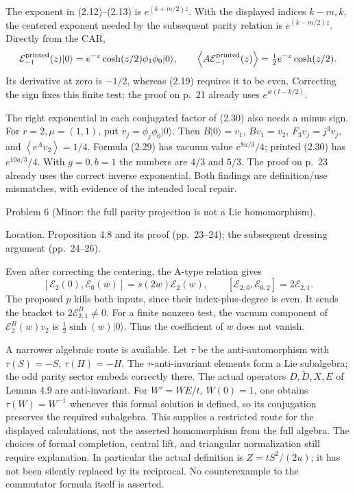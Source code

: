 \documentclass[10pt]{article}
\begin{document}
The exponent in (2.12)–(2.13) is \(e^{(k+m/2)z}\). With the displayed indices \(k-m,k\), the centered exponent needed by the subsequent parity relation is \(e^{(k-m/2)z}\). Directly from the CAR, \[\mathcal E_{-1}^{\rm printed}(z)|0\rangle
 =e^{-z}\cosh(z/2)\phi_1\phi_0|0\rangle,\qquad
 \left\langle A\mathcal E_{-1}^{\rm printed}(z)\right\rangle
 =\tfrac12e^{-z}\cosh(z/2).\] Its derivative at zero is \(-1/2\), whereas (2.19) requires it to be even. Correcting the sign fixes this finite test; the proof on p. 21 already uses \(e^{w(l-k/2)}\).\par
The right exponential in each conjugated factor of (2.30) also needs a minus sign. For \(r=2,\mu=(1,1)\), put \(v_j=\phi_j\phi_0|0\rangle\). Then \(B|0\rangle=v_1\), \(Bv_1=v_2\), \(F_3v_j=j^3v_j\), and \(\left\langle e^A v_2\right\rangle=1/4\). Formula (2.29) has vacuum value \(e^{8u/3}/4\); printed (2.30) has \(e^{10u/3}/4\). With \(g=0,b=1\) the numbers are \(4/3\) and \(5/3\). The proof on p. 23 already uses the correct inverse exponential. Both findings are definition/use mismatches, with evidence of the intended local repair.\par
Problem 6 (Minor: the full parity projection is not a Lie homomorphism).\par
Location. Proposition 4.8 and its proof (pp. 23–24); the subsequent dressing argument (pp. 24–26).\par
Even after correcting the centering, the A-type relation gives \[[\mathcal E_2(0),\mathcal E_0(w)]=s(2w)\mathcal E_2(w),\qquad
 [\mathcal E_{2,0},\mathcal E_{0,2}]=2\mathcal E_{2,1}.\] The proposed \(p\) kills both inputs, since their index-plus-degree is even. It sends the bracket to \(2\mathcal E^B_{2,1}\neq0\). For a finite nonzero test, the vacuum component of \(\mathcal E^B_2(w)v_2\) is \(\tfrac12\sinh(w)|0\rangle\). Thus the coefficient of \(w\) does not vanish.\par
A narrower algebraic route is available. Let \(\tau\) be the anti-automorphism with \(\tau(S)=-S\), \(\tau(H)=-H\). The \(\tau\)-anti-invariant elements form a Lie subalgebra; the odd parity sector embeds correctly there. The actual operators \(D,\widetilde D,X,E\) of Lemma 4.9 are anti-invariant. For \(W'=WE/t\), \(W(0)=1\), one obtains \(\tau(W)=W^{-1}\) whenever this formal solution is defined, so its conjugation preserves the required subalgebra. This supplies a restricted route for the displayed calculations, not the asserted homomorphism from the full algebra. The choices of formal completion, central lift, and triangular normalization still require explanation. In particular the actual definition is \(Z=tS^2/(2u)\); it has not been silently replaced by its reciprocal. No counterexample to the commutator formula itself is asserted.\par
\end{document}
